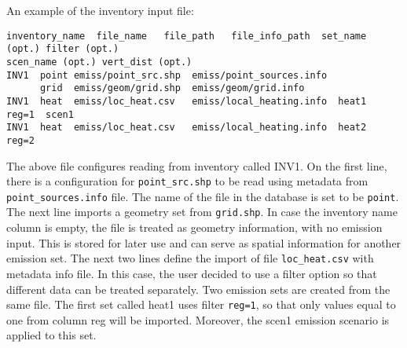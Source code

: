 \documentclass[a4paper,11pt]{article}
\begin{document}
An example of the inventory input file:
\begin{verbatim} 
inventory_name	file_name	file_path	file_info_path	set_name (opt.)	filter (opt.) 
scen_name (opt.) vert_dist (opt.)        
INV1  point emiss/point_src.shp  emiss/point_sources.info
      grid  emiss/geom/grid.shp  emiss/geom/grid.info
INV1  heat  emiss/loc_heat.csv   emiss/local_heating.info  heat1  reg=1  scen1
INV1  heat  emiss/loc_heat.csv   emiss/local_heating.info  heat2  reg=2
\end{verbatim}

The above file configures reading from inventory called INV1. On the first line, there is a configuration for \verb|point_src.shp| to be read using metadata from \verb|point_sources.info| file. The name of the file in the database is set to be \verb|point|. The next line imports a geometry set from \verb|grid.shp|. In case the inventory name column is empty, the file is treated as geometry information, with no emission input. This is stored for later use and can serve as spatial information for another emission set. The next two lines define the import of file \verb|loc_heat.csv| with metadata info file. In this case, the user decided to use a filter option so that different data can be treated separately. Two emission sets are created from the same file. The first set called heat1 uses filter \verb|reg=1|, so that only values equal to one from column reg will be imported. Moreover, the scen1 emission scenario is applied to this set.
\end{document}
